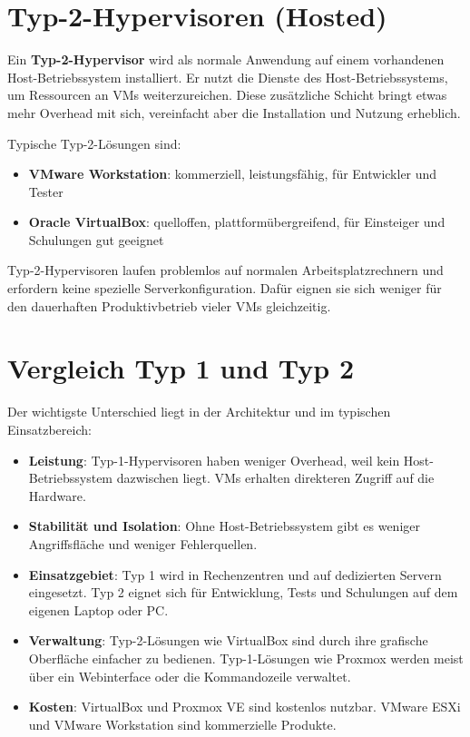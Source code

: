 \documentclass[11pt, oneside, numbers=noenddot]{scrbook}
\begin{document}
\section{Typ-2-Hypervisoren (Hosted)}
Ein \textbf{Typ-2-Hypervisor} wird als normale Anwendung auf einem vorhandenen Host-Betriebssystem installiert. Er nutzt die Dienste des Host-Betriebssystems, um Ressourcen an VMs weiterzureichen. Diese zusätzliche Schicht bringt etwas mehr Overhead mit sich, vereinfacht aber die Installation und Nutzung erheblich.

Typische Typ-2-Lösungen sind:
\begin{itemize}
  \item \textbf{VMware Workstation}: kommerziell, leistungsfähig, für Entwickler und Tester
  \item \textbf{Oracle VirtualBox}: quelloffen, plattformübergreifend, für Einsteiger und Schulungen gut geeignet
\end{itemize}

Typ-2-Hypervisoren laufen problemlos auf normalen Arbeitsplatzrechnern und erfordern keine spezielle Serverkonfiguration. Dafür eignen sie sich weniger für den dauerhaften Produktivbetrieb vieler VMs gleichzeitig.

\section{Vergleich Typ 1 und Typ 2}
Der wichtigste Unterschied liegt in der Architektur und im typischen Einsatzbereich:

\begin{itemize}
  \item \textbf{Leistung}: Typ-1-Hypervisoren haben weniger Overhead, weil kein Host-Betriebssystem dazwischen liegt. VMs erhalten direkteren Zugriff auf die Hardware.
  \item \textbf{Stabilität und Isolation}: Ohne Host-Betriebssystem gibt es weniger Angriffsfläche und weniger Fehlerquellen.
  \item \textbf{Einsatzgebiet}: Typ 1 wird in Rechenzentren und auf dedizierten Servern eingesetzt. Typ 2 eignet sich für Entwicklung, Tests und Schulungen auf dem eigenen Laptop oder PC.
  \item \textbf{Verwaltung}: Typ-2-Lösungen wie VirtualBox sind durch ihre grafische Oberfläche einfacher zu bedienen. Typ-1-Lösungen wie Proxmox werden meist über ein Webinterface oder die Kommandozeile verwaltet.
  \item \textbf{Kosten}: VirtualBox und Proxmox VE sind kostenlos nutzbar. VMware ESXi und VMware Workstation sind kommerzielle Produkte.
\end{itemize}
\end{document}
